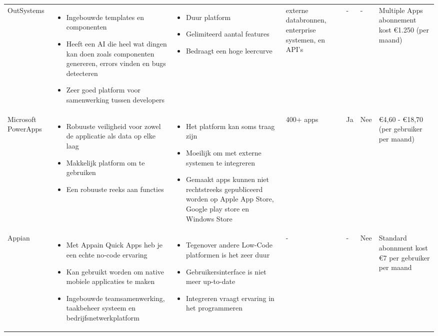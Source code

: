 \begin{longtable}{p{2.2cm} p{2.4cm} p{2.4cm} p{2.2cm} p{2.2cm} p{2.2cm} p{2.2cm}}
    OutSystems & 
    \begin{itemize}
        \item Ingebouwde templates en componenten
        \item Heeft een AI die heel wat dingen kan doen zoals componenten genereren, errors vinden en bugs detecteren 
        \item Zeer goed platform voor samenwerking tussen developers
    \end{itemize} & 
    \begin{itemize}
        \item  Duur platform
        \item  Gelimiteerd aantal features
        \item  Bedraagt een hoge leercurve
    \end{itemize} &
    externe databronnen, enterprise systemen, en API's &
    - &
    - &
    Multiple Apps abonnement kost €1.250 (per maand)\\

    Microsoft PowerApps & 
    \begin{itemize}
        \item Robuuste veiligheid voor zowel de applicatie als data op elke laag
        \item Makkelijk platform om te gebruiken
        \item Een robuuste reeks aan functies
    \end{itemize} & 
    \begin{itemize}
        \item Het platform kan soms traag zijn
        \item Moeilijk om met externe systemen te integreren
        \item Gemaakt apps kunnen niet rechtstreeks gepubliceerd worden op Apple App Store, Google play store en Windows Store
    \end{itemize} &
    400+ apps &
    Ja &
    Nee &
    €4,60 - €18,70 (per gebruiker per maand)\\


    Appian & 
    \begin{itemize}
        \item Met Appain Quick Apps heb je een echte no-code ervaring
        \item Kan gebruikt worden om native mobiele applicaties te maken
        \item Ingebouwde teamsamenwerking, taakbeheer systeem en bedrijfsnetwerkplatform
    \end{itemize} & 
    \begin{itemize}
        \item Tegenover andere Low-Code platformen is het zeer duur
        \item Gebruikersinterface is niet meer up-to-date 
        \item Integreren vraagt ervaring in het programmeren
    \end{itemize} &
    - &
    - &
    Nee &
    Standard abonnment kost €7 per gebruiker per maand\\


\end{longtable}
